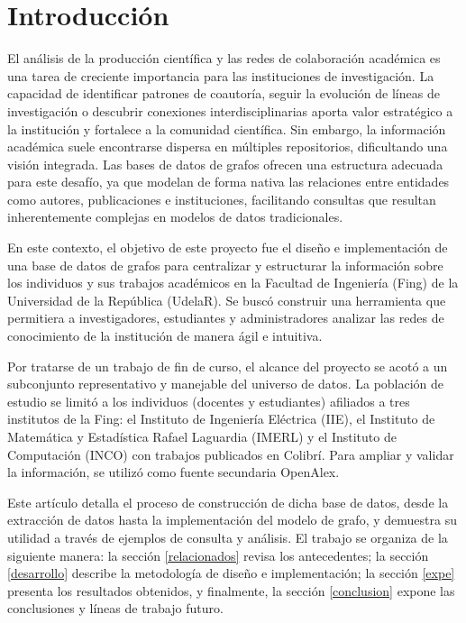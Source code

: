 \documentclass[journal]{IEEEtran}
\begin{document}
\section{Introducción}
\label{introduccion}
El análisis de la producción científica y las redes de colaboración académica es una tarea de creciente importancia para las instituciones de investigación. La capacidad de identificar patrones de coautoría, seguir la evolución de líneas de investigación o descubrir conexiones interdisciplinarias aporta valor estratégico a la institución y fortalece a la comunidad científica. Sin embargo, la información académica suele encontrarse dispersa en múltiples repositorios, dificultando una visión integrada. Las bases de datos de grafos ofrecen una estructura adecuada para este desafío, ya que modelan de forma nativa las relaciones entre entidades como autores, publicaciones e instituciones, facilitando consultas que resultan inherentemente complejas en modelos de datos tradicionales.

En este contexto, el objetivo de este proyecto fue el diseño e implementación de una base de datos de grafos para centralizar y estructurar la información sobre los individuos y sus trabajos académicos en la Facultad de Ingeniería (Fing) de la Universidad de la República (UdelaR). Se buscó construir una herramienta que permitiera a investigadores, estudiantes y administradores analizar las redes de conocimiento de la institución de manera ágil e intuitiva.

Por tratarse de un trabajo de fin de curso, el alcance del proyecto se acotó a un subconjunto representativo y manejable del universo de datos. La población de estudio se limitó a los individuos (docentes y estudiantes) afiliados a tres institutos de la Fing: el Instituto de Ingeniería Eléctrica (IIE), el Instituto de Matemática y Estadística Rafael Laguardia (IMERL) y el Instituto de Computación (INCO) con trabajos publicados en Colibrí. Para ampliar y validar la información, se utilizó como fuente secundaria OpenAlex.

Este artículo detalla el proceso de construcción de dicha base de datos, desde la extracción de datos hasta la implementación del modelo de grafo, y demuestra su utilidad a través de ejemplos de consulta y análisis. El trabajo se organiza de la siguiente manera: la sección \ref{relacionados} revisa los antecedentes; la sección \ref{desarrollo} describe la metodología de diseño e implementación; la sección \ref{expe} presenta los resultados obtenidos, y finalmente, la sección \ref{conclusion} expone las conclusiones y líneas de trabajo futuro.
\end{document}
